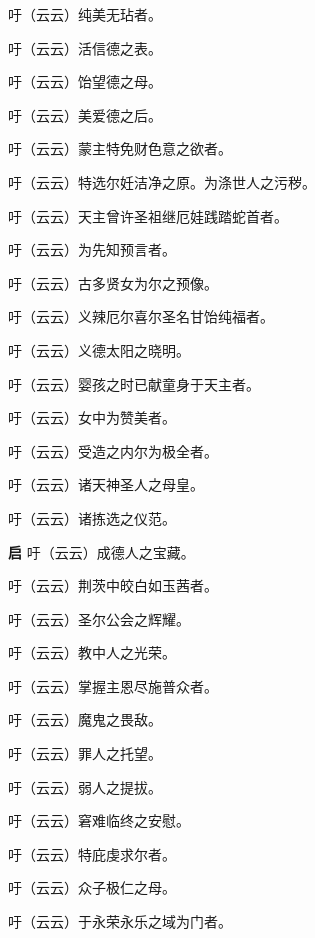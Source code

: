 \documentclass[UTF8,17pt]{ctexart}
\begin{document}
 吁（云云）纯美⽆玷者。

 吁（云云）活信德之表。

 吁（云云）饴望德之母。

 吁（云云）美爱德之后。

 吁（云云）蒙主特免财⾊意之欲者。

 吁（云云）特选尔妊洁净之原。为涤世⼈之污秽。

 吁（云云）天主曾许圣祖继厄娃践踏蛇⾸者。

 吁（云云）为先知预⾔者。

 吁（云云）古多贤⼥为尔之预像。

 吁（云云）义辣厄尔喜尔圣名⽢饴纯福者。

 吁（云云）义德太阳之晓明。

 吁（云云）婴孩之时已献童⾝于天主者。

 吁（云云）⼥中为赞美者。

 吁（云云）受造之内尔为极全者。

 吁（云云）诸天神圣⼈之母皇。

 吁（云云）诸拣选之仪范。

\textbf{启} \quad 吁（云云）成德⼈之宝藏。

 吁（云云）荆茨中皎⽩如⽟茜者。

 吁（云云）圣尔公会之辉耀。

 吁（云云）教中⼈之光荣。

 吁（云云）掌握主恩尽施普众者。

 吁（云云）魔⿁之畏敌。

 吁（云云）罪⼈之托望。

 吁（云云）弱⼈之提拔。

 吁（云云）窘难临终之安慰。

 吁（云云）特庇虔求尔者。

 吁（云云）众⼦极仁之母。

 吁（云云）于永荣永乐之域为门者。
\end{document}
